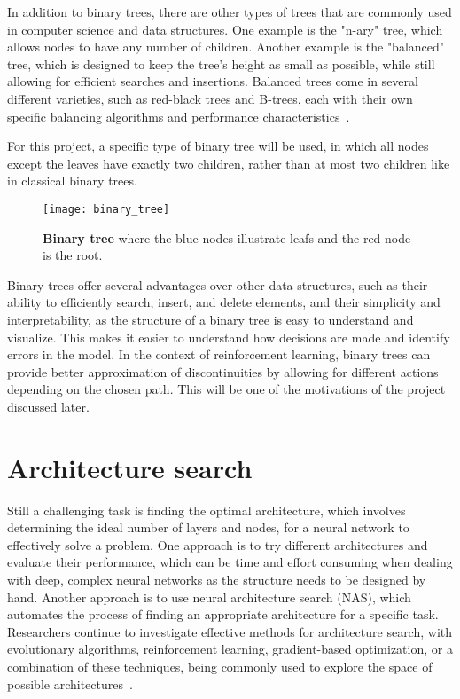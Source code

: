 In addition to binary trees, there are other types of trees that are commonly used in computer science and data structures. One example is the "n-ary" tree, which allows nodes to have any number of children. Another example is the "balanced" tree, which is designed to keep the tree's height as small as possible, while still allowing for efficient searches and insertions. Balanced trees come in several different varieties, such as red-black trees and B-trees, each with their own specific balancing algorithms and performance characteristics~\cite{michael_t_data_2014}.

For this project, a specific type of binary tree will be used, in which all nodes except the leaves have exactly two children, rather than at most two children like in classical binary trees.

\begin{figure}[!ht]
\centering
\texttt{[image: binary\_tree]}
\caption[Binary tree representation]{{}
  \textbf{Binary tree} where the blue nodes illustrate leafs and the red node is the root.
  }
\label{fig:binary_tree}
\end{figure}

Binary trees offer several advantages over other data structures, such as their ability to efficiently search, insert, and delete elements, and their simplicity and interpretability, as the structure of a binary tree is easy to understand and visualize. This makes it easier to understand how decisions are made and identify errors in the model. In the context of reinforcement learning, binary trees can provide better approximation of discontinuities by allowing for different actions depending on the chosen path. This will be one of the motivations of the project discussed later.

\section{Architecture search}

Still a challenging task is finding the optimal architecture, which involves determining the ideal number of layers and nodes, for a neural network to effectively solve a problem. One approach is to try different architectures and evaluate their performance, which can be time and effort consuming when dealing with deep, complex neural networks as the structure needs to be designed by hand. Another approach is to use neural architecture search (NAS), which automates the process of finding an appropriate architecture for a specific task. Researchers continue to investigate effective methods for architecture search, with evolutionary algorithms, reinforcement learning, gradient-based optimization, or a combination of these techniques, being commonly used to explore the space of possible architectures~\cite{elsken_neural_2019}.

